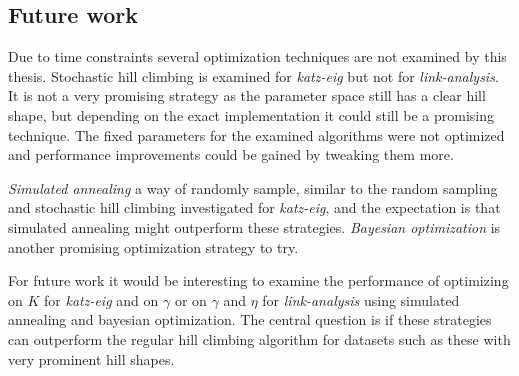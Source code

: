 \subsection{Future work}

Due to time constraints several optimization techniques are not examined by this thesis. Stochastic hill climbing is examined for \textit{katz-eig} but not for \textit{link-analysis}. It is not a very promising strategy as the parameter space still has a clear hill shape, but depending on the exact implementation it could still be a promising technique. The fixed parameters for the examined algorithms were not optimized and performance improvements could be gained by tweaking them more.

\textit{Simulated annealing} a way of randomly sample, similar to the random sampling and stochastic hill climbing investigated for \textit{katz-eig}, and the expectation is that simulated annealing might outperform these strategies. \textit{Bayesian optimization} is another promising optimization strategy to try.

For future work it would be interesting to examine the performance of optimizing on $K$ for \textit{katz-eig} and on $\gamma$ or on $\gamma$ and $\eta$ for \textit{link-analysis} using simulated annealing and bayesian optimization. The central question is if these strategies can outperform the regular hill climbing algorithm for datasets such as these with very prominent hill shapes.



